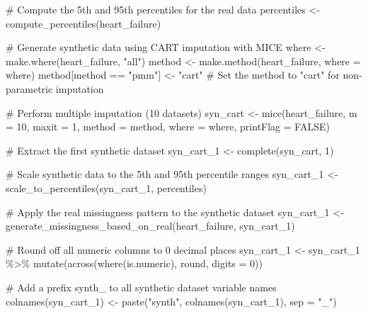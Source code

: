 \documentclass[
  letterpaper,
  DIV=11,
  numbers=noendperiod]{scrartcl}
\newenvironment{Shaded}{\begin{snugshade}}{\end{snugshade}}
\newcommand{\AttributeTok}[1]{\textcolor[rgb]{0.40,0.45,0.13}{#1}}
\newcommand{\CommentTok}[1]{\textcolor[rgb]{0.37,0.37,0.37}{#1}}
\newcommand{\ConstantTok}[1]{\textcolor[rgb]{0.56,0.35,0.01}{#1}}
\newcommand{\DecValTok}[1]{\textcolor[rgb]{0.68,0.00,0.00}{#1}}
\newcommand{\FunctionTok}[1]{\textcolor[rgb]{0.28,0.35,0.67}{#1}}
\newcommand{\NormalTok}[1]{\textcolor[rgb]{0.00,0.23,0.31}{#1}}
\newcommand{\OtherTok}[1]{\textcolor[rgb]{0.00,0.23,0.31}{#1}}
\newcommand{\SpecialCharTok}[1]{\textcolor[rgb]{0.37,0.37,0.37}{#1}}
\newcommand{\StringTok}[1]{\textcolor[rgb]{0.13,0.47,0.30}{#1}}
\begin{document}
\begin{Shaded}
\begin{Highlighting}[]
\CommentTok{\# Compute the 5th and 95th percentiles for the real data}
\NormalTok{percentiles }\OtherTok{\textless{}{-}} \FunctionTok{compute\_percentiles}\NormalTok{(heart\_failure)}

\CommentTok{\# Generate synthetic data using CART imputation with MICE}
\NormalTok{where }\OtherTok{\textless{}{-}} \FunctionTok{make.where}\NormalTok{(heart\_failure, }\StringTok{"all"}\NormalTok{)}
\NormalTok{method }\OtherTok{\textless{}{-}} \FunctionTok{make.method}\NormalTok{(heart\_failure, }\AttributeTok{where =}\NormalTok{ where)}
\NormalTok{method[method }\SpecialCharTok{==} \StringTok{"pmm"}\NormalTok{] }\OtherTok{\textless{}{-}} \StringTok{"cart"}  \CommentTok{\# Set the method to "cart" for non{-}parametric imputation}

\CommentTok{\# Perform multiple imputation (10 datasets)}
\NormalTok{syn\_cart }\OtherTok{\textless{}{-}} \FunctionTok{mice}\NormalTok{(heart\_failure, }\AttributeTok{m =} \DecValTok{10}\NormalTok{, }\AttributeTok{maxit =} \DecValTok{1}\NormalTok{, }\AttributeTok{method =}\NormalTok{ method, }\AttributeTok{where =}\NormalTok{ where, }\AttributeTok{printFlag =} \ConstantTok{FALSE}\NormalTok{)}

\CommentTok{\# Extract the first synthetic dataset}
\NormalTok{syn\_cart\_1 }\OtherTok{\textless{}{-}} \FunctionTok{complete}\NormalTok{(syn\_cart, }\DecValTok{1}\NormalTok{)}

\CommentTok{\# Scale synthetic data to the 5th and 95th percentile ranges}
\NormalTok{syn\_cart\_1 }\OtherTok{\textless{}{-}} \FunctionTok{scale\_to\_percentiles}\NormalTok{(syn\_cart\_1, percentiles)}

\CommentTok{\# Apply the real missingness pattern to the synthetic dataset}
\NormalTok{syn\_cart\_1 }\OtherTok{\textless{}{-}} \FunctionTok{generate\_missingness\_based\_on\_real}\NormalTok{(heart\_failure, syn\_cart\_1)}

\CommentTok{\# Round off all numeric columns to 0 decimal places}
\NormalTok{syn\_cart\_1 }\OtherTok{\textless{}{-}}\NormalTok{ syn\_cart\_1 }\SpecialCharTok{\%\textgreater{}\%}
  \FunctionTok{mutate}\NormalTok{(}\FunctionTok{across}\NormalTok{(}\FunctionTok{where}\NormalTok{(is.numeric), round, }\AttributeTok{digits =} \DecValTok{0}\NormalTok{))}

\CommentTok{\# Add a prefix \textquotesingle{}synth\_\textquotesingle{} to all synthetic dataset variable names}
\FunctionTok{colnames}\NormalTok{(syn\_cart\_1) }\OtherTok{\textless{}{-}} \FunctionTok{paste}\NormalTok{(}\StringTok{"synth"}\NormalTok{, }\FunctionTok{colnames}\NormalTok{(syn\_cart\_1), }\AttributeTok{sep =} \StringTok{"\_"}\NormalTok{)}


\end{Highlighting}
\end{Shaded}
\end{document}
